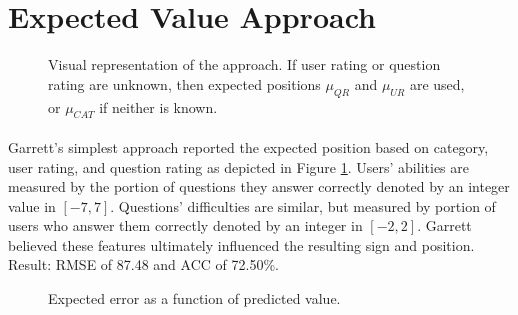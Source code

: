 \documentclass[letterpaper]{article}
\begin{document}
\section{Expected Value Approach}

\begin{figure}[H]
	\begin{center}
	\end{center}
	\caption{Visual representation of the approach. If user rating or question rating are unknown, then expected positions $\mu_{QR}$ and $\mu_{UR}$ are used, or $\mu_{CAT}$ if neither is known.}
	\label{fig:expectedValue}
\end{figure}

\paragraph{} Garrett's simplest approach reported the expected position based on category, user rating, and question rating as depicted in Figure \ref{fig:expectedValue}. Users' abilities are measured by the portion of questions they answer correctly denoted by an integer value in $[-7, 7]$. Questions' difficulties are similar, but measured by portion of users who answer them correctly denoted by an integer in $[-2, 2]$. Garrett believed these features ultimately influenced the resulting sign and position. Result: RMSE of 87.48 and ACC of 72.50\%.

\begin{figure}[H]
	\begin{center}
	\end{center}
	\caption{Expected error as a function of predicted value.}
	\label{fig:expectedValue:errorAnalysis}
\end{figure}
\end{document}
